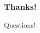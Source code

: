 \documentclass{beamer}
\begin{document}






\begin{frame}
	\frametitle{Thanks!}

	\centering
		\Large Questions!
\end{frame}
\end{document}
